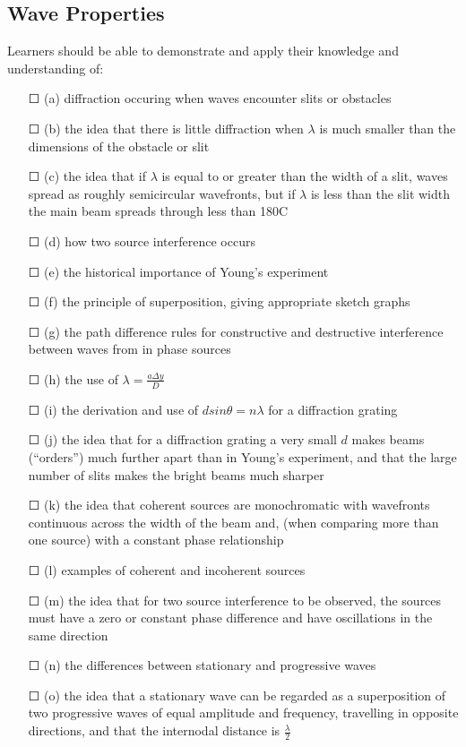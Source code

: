 \subsection{Wave Properties}Learners should be able to demonstrate and apply their knowledge and
understanding of:
\begin{itemize}
	\item[\Large{$\Square$}] (a) diffraction occuring when waves encounter slits or obstacles
	\item[\Large{$\Square$}]	(b) the idea that there is little diffraction when $\lambda$ is much smaller than the dimensions of the obstacle or slit
	\item[\Large{$\Square$}]	(c) the idea that if $\lambda$ is equal to or greater than the width of a slit, waves spread	as roughly semicircular wavefronts, but if $\lambda$ is less than the slit width the main	beam spreads through less than 180C
	\item[\Large{$\Square$}]	(d) how two source interference occurs
	\item[\Large{$\Square$}]	(e) the historical importance of Young’s experiment
	\item[\Large{$\Square$}]	(f) the principle of superposition, giving appropriate sketch graphs
	\item[\Large{$\Square$}]	(g) the path difference rules for constructive and destructive interference between waves from in phase sources
	\item[\Large{$\Square$}]	(h) the use of \( \lambda= \frac{a \Delta y}{D} \)
	\item[\Large{$\Square$}]	(i) the derivation and use of $d sin \theta = n \lambda$ for a diffraction grating
	\item[\Large{$\Square$}]	(j) the idea that for a diffraction grating a very small $d$ makes beams (“orders”) much further apart than in Young’s experiment, and that the large number of
	slits makes the bright beams much sharper
	\item[\Large{$\Square$}]	(k) the idea that coherent sources are monochromatic with wavefronts
	continuous across the width of the beam and, (when comparing more than one source) with a constant phase relationship
	\item[\Large{$\Square$}]	(l) examples of \sq coherent and \sq incoherent sources
	\item[\Large{$\Square$}]	(m) the idea that for two source interference to be observed, the sources must have a zero or constant phase difference and have oscillations in the same
	direction
	\item[\Large{$\Square$}]	(n) the differences between stationary and progressive waves
	\item[\Large{$\Square$}]	(o) the idea that a stationary wave can be regarded as a superposition of two	progressive waves of equal amplitude and frequency, travelling in opposite directions, and that \sq the internodal distance is $ \frac{\lambda}{2}$

\end{itemize}
